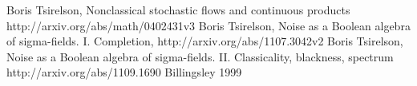 \begin{thebibliography}{99}
 Boris Tsirelson,
  Nonclassical stochastic flows and continuous products
  http://arxiv.org/abs/math/0402431v3
 Boris Tsirelson, Noise as a Boolean
  algebra of sigma-fields. I. Completion, http://arxiv.org/abs/1107.3042v2
 Boris Tsirelson,
  Noise as a Boolean algebra of sigma-fields. II. Classicality,
  blackness, spectrum
  http://arxiv.org/abs/1109.1690
 Billingsley 1999
\end{thebibliography}
